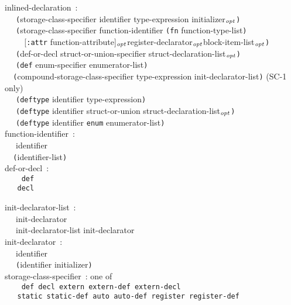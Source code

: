 \documentclass[a4]{article}
\def\|{\verb|} %|
\newcommand{\opt}{$_{{\it opt}}$}
\newcommand{\scoo}{{\rm \hfill (SC-1 only)}}
\begin{document}
\noindent
inlined-declaration{\rm \ :} \\
\|  | {\tt (}storage-class-specifier identifier type-expression initializer\opt{\tt )} \\
\|  | {\tt (}storage-class-specifier function-identifier {\tt (fn} function-type-list{\tt )}\\
\|    | {\rm [}{\tt :attr} function-attribute{\rm ]}\opt register-declarator\opt block-item-list\opt{\tt )} \\ 
\|  | {\tt (}def-or-decl struct-or-union-specifier struct-declaration-list\opt{\tt )} \\
\|  | {\tt (def} enum-specifier enumerator-list{\tt )} \\
\|  | {\tt (}compound-storage-class-specifier type-expression init-declarator-list{\tt )} \scoo \\
\|  | {\tt (deftype} identifier type-expression{\tt )} \\
\|  | {\tt (deftype} identifier struct-or-union struct-declaration-list\opt{\tt )} \\
\|  | {\tt (deftype} identifier {\tt enum} enumerator-list{\tt )} \\

\noindent
function-identifier{\rm \ :} \\
\|  | identifier \\
\|  | {\tt (}identifier-list{\tt )} \\

\noindent
def-or-decl{\rm \ :} \\ \tt
\|  | def \\
\|  | decl \\ \it

\noindent
init-declarator-list{\rm \ :} \\
\|  | init-declarator \\
\|  | init-declarator-list init-declarator \\ 

\noindent
init-declarator{\rm \ :} \\
\|  | identifier \\
\|  | {\tt (}identifier initializer{\tt )} \\ 

\noindent
storage-class-specifier{\rm \ :} {\rm one of} \\  \tt
\|  | def decl extern extern-def extern-decl\\
\|  | static static-def auto auto-def register register-def \\ \it
\end{document}
